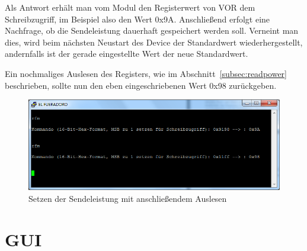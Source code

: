 \documentclass[paper=a4, parskip, numbers=noenddot, toc=listof, headsepline]{scrbook}
\begin{document}
					Als Antwort erhält man vom Modul den Registerwert von VOR dem Schreibzugriff, im Beispiel also den Wert 0x9A. Anschließend erfolgt eine Nachfrage, ob die Sendeleistung dauerhaft gespeichert werden soll. Verneint man dies, wird beim nächsten Neustart des Device der Standardwert wiederhergestellt, andernfalls ist der gerade eingestellte Wert der neue Standardwert.

					Ein nochmaliges Auslesen des Registers, wie im Abschnitt~\ref{subsec:readpower} beschrieben, sollte nun den eben eingeschriebenen Wert 0x98 zurückgeben.

					\begin{figure}
						\centering
						\includegraphics[width=.8\textwidth]{Bilder/rfmbefehl2}
						\caption{Setzen der Sendeleistung mit anschließendem Auslesen}
						\label{fig:rfmwrite}
					\end{figure}
					\clearpage

		\section{GUI}
\end{document}
